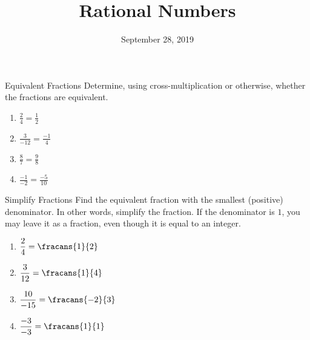 \documentclass[12pt,letterpaper]{article}
\title{Rational Numbers}
\date{September 28, 2019}
\begin{document}
\maketitle

\thispagestyle{empty}

\begin{problem}{Equivalent Fractions}
  Determine, using cross-multiplication or otherwise, whether the fractions are equivalent.

  \begin{multicols}{2}
  \begin{enumerate}[\hspace{.5cm}a.]
    \item \( \displaystyle \frac{2}{4} = \frac{1}{2} \)     \hfill \TFTrue
    \item \( \displaystyle \frac{3}{-12} = \frac{-1}{4} \)  \hfill \TFTrue
    \item \( \displaystyle \frac{8}{7} = \frac{9}{8} \)     \hfill \TFFalse
    \item \( \displaystyle \frac{-1}{-2} = \frac{-5}{10} \) \hfill \TFFalse
  \end{enumerate}
  \end{multicols}
\end{problem}

\begin{problem}{Simplify Fractions}
  Find the equivalent fraction with the smallest (positive) denominator. In other words,
  simplify the fraction. If the denominator is \(1\), you may leave it as a fraction, even
  though it is equal to an integer.

  \begin{multicols}{2}
  \begin{enumerate}[\hspace{.5cm}a.]
    \item \( \displaystyle \frac{2}{4} = \fracans{1}{2} \)
    \item \( \displaystyle \frac{3}{12} = \fracans{1}{4} \)
    \item \( \displaystyle \frac{10}{-15} = \fracans{-2}{3} \)
    \item \( \displaystyle \frac{-3}{-3} = \fracans{1}{1} \)
  \end{enumerate}
  \end{multicols}
\end{problem}
\end{document}
